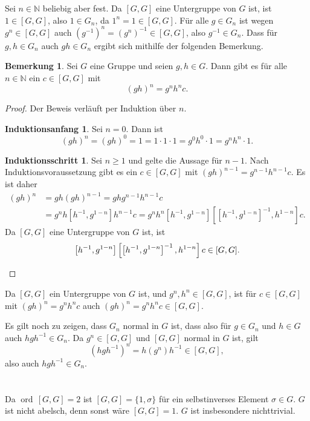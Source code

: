 \documentclass[a4paper,10pt]{article}
\theoremstyle{definition}
\newtheorem{bem}[beh]{Bemerkung}
\newtheorem*{ia}{Induktionsanfang}
\newtheorem*{is}{Induktionsschritt}
\newcommand{\N}{\mathbb{N}}
\newcommand{\ord}{\operatorname{ord}}
\begin{document}
\section{}
Sei $n \in \N$ beliebig aber fest. Da $[G,G]$ eine Untergruppe von $G$ ist, ist $1 \in [G,G]$, also $1 \in G_n$, da $1^n = 1 \in [G,G]$. Für alle $g \in G_n$ ist wegen $g^n \in [G,G]$ auch $(g^{-1})^n = (g^n)^{-1} \in [G,G]$, also $g^{-1} \in G_n$. Dass für $g,h \in G_n$ auch $gh \in G_n$ ergibt sich mithilfe der folgenden Bemerkung.

\begin{bem}
 Sei $G$ eine Gruppe und seien $g,h \in G$. Dann gibt es für alle $n \in \N$ ein $c \in [G,G]$ mit
 \[
  (gh)^n = g^n h^n c.
 \]
\end{bem}
\begin{proof}
 Der Beweis verläuft per Induktion über $n$.
 \begin{ia}
  Sei $n=0$. Dann ist
  \[
   (gh)^n = (gh)^0 = 1 = 1 \cdot 1 \cdot 1 = g^0 h^0 \cdot 1 = g^n h^n \cdot 1.
  \]
 \end{ia}
 \begin{is}
  Sei $n \geq 1$ und gelte die Aussage für $n-1$. Nach Induktionsvoraussetzung gibt es ein $c \in [G,G]$ mit $(gh)^{n-1} = g^{n-1} h^{n-1} c$. Es ist daher
  \begin{align*}
   (gh)^n
   &= gh (gh)^{n-1}
   = gh g^{n-1} h^{n-1} c \\
   &= g^n h \left[h^{-1},g^{1-n}\right] h^{n-1} c
   = g^n h^n \left[h^{-1},g^{1-n}\right] \left[\left[h^{-1},g^{1-n}\right]^{-1}, h^{1-n}\right] c.
  \end{align*}
  Da $[G,G]$ eine Untergruppe von $G$ ist, ist
  \[
   \left[h^{-1},g^{1-n}\right] \left[\left[h^{-1},g^{1-n}\right]^{-1}, h^{1-n}\right] c \in [G,G]. \qedhere
  \]
 \end{is}
\end{proof}

Da $[G,G]$ ein Untergruppe von $G$ ist, und $g^n, h^n \in [G,G]$, ist für $c \in [G,G]$ mit $(gh)^n = g^n h^n c$ auch $(gh)^n = g^n h^n c \in [G,G]$.

Es gilt noch zu zeigen, dass $G_n$ normal in $G$ ist, dass also für $g \in G_n$ und $h \in G$ auch $hgh^{-1} \in G_n$. Da $g^n \in [G,G]$ und $[G,G]$ normal in $G$ ist, gilt
\[
 (hgh^{-1})^n = h(g^n)h^{-1} \in [G,G],
\]
also auch $hgh^{-1} \in G_n$.





\section{}
Da $\ord\,[G,G] = 2$ ist $[G,G] = \{1, \sigma\}$ für ein selbstinverses Element $\sigma \in G$. $G$ ist nicht abelsch, denn sonst wäre $[G,G] = 1$. $G$ ist insbesondere nichttrivial.
\end{document}
